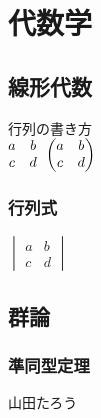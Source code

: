 \documentclass[11pt,a4j]{jreport}
\begin{document}
\chapter{代数学}
\thispagestyle{fancy}
\section{線形代数}
行列の書き方\\
$
\begin{matrix}
    a & b \\
    c & d
\end{matrix}\\
\begin{pmatrix}
    a & b \\
    c & d
\end{pmatrix}\\
$
\subsection{行列式}
$
\begin{vmatrix}
    a & b \\
    c & d
\end{vmatrix}
$

\section{群論}
\subsection{準同型定理}




\renewcommand{\bibname}{参考文献}
\begin{thebibliography}{99}
\end{thebibliography}
山田たろう
\end{document}
